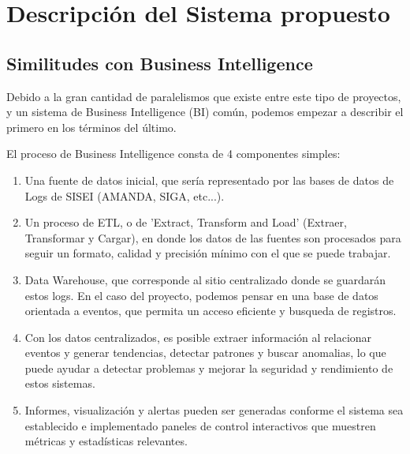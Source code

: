 
\section{Descripción del Sistema propuesto}
\label{section:descripcion}

\subsection{Similitudes con Business Intelligence}

Debido a la gran cantidad de paralelismos que existe entre este tipo de proyectos, y un sistema de Business Intelligence (BI) común, podemos empezar a describir el primero en los términos del último.


El proceso de Business Intelligence consta de 4 componentes simples:

\begin{enumerate}
  \item Una fuente de datos inicial, que sería representado por las bases de datos de Logs de SISEI (AMANDA, SIGA, etc...).
  \item Un proceso de ETL, o de 'Extract, Transform and Load' (Extraer, Transformar y Cargar), en donde los datos de las fuentes son procesados para seguir un formato, calidad y precisión mínimo con el que se puede trabajar.
  \item Data Warehouse, que corresponde al sitio centralizado donde se guardarán estos logs. En el caso del proyecto, podemos pensar en una base de datos orientada a eventos, que permita un acceso eficiente y busqueda de registros.
  \item Con los datos centralizados, es posible extraer información al relacionar eventos y generar tendencias, detectar patrones y buscar anomalias, lo que puede ayudar a detectar problemas y mejorar la seguridad y rendimiento de estos sistemas.
  \item Informes, visualización y alertas pueden ser generadas conforme el sistema sea establecido e implementado paneles de control interactivos que muestren métricas y estadísticas relevantes.
\end{enumerate}

